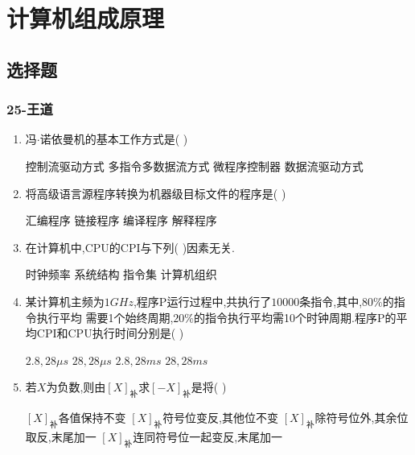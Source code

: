 \documentclass[12pt, a4paper, oneside, UTF8]{ctexbook}
\begin{document}
% 
\else
\fi
\chapter{计算机组成原理}

\section{选择题}

\subsection{25-王道}
\begin{enumerate}
    \item 冯$\cdot$诺依曼机的基本工作方式是(  ) 
    \begin{choices}[2]
    \task 控制流驱动方式 \task 多指令多数据流方式
    \task 微程序控制器 \task 数据流驱动方式
    \end{choices}
    
    \item \bt 将高级语言源程序转换为机器级目标文件的程序是(   ) 
    \begin{choices}
        \task 汇编程序 
        \task 链接程序 
        \task 编译程序 
        \task 解释程序
    \end{choices}

    \item 在计算机中,CPU的CPI与下列(   )因素无关.
    \begin{choices}
        \task 时钟频率 \task 系统结构 
        \task 指令集 \task 计算机组织 
    \end{choices}


    \item 某计算机主频为$1GHz$,程序P运行过程中,共执行了$10000$条指令,其中,$80\%$的指令执行平均
    需要1个始终周期,$20\%$的指令执行平均需10个时钟周期.程序P的平均CPI和CPU执行时间分别是(   ) 
    \begin{choices}
        \task $2.8,28\mu s$ 
        \task $28,28\mu s$
        \task $2.8,28ms$
        \task $28,28ms$ 
    \end{choices}
    

    \item 若$X$为负数,则由$[X]_{\text{补}}$求$[-X]_{\text{补}}$是将(   )
    \begin{choices}[1]
        \task $[X]_{\text{补}}$各值保持不变
        \task $[X]_{\text{补}}$符号位变反,其他位不变
        \task $[X]_{\text{补}}$除符号位外,其余位取反,末尾加一
        \task $[X]_{\text{补}}$连同符号位一起变反,末尾加一
    \end{choices}



\end{enumerate}
\end{document}
